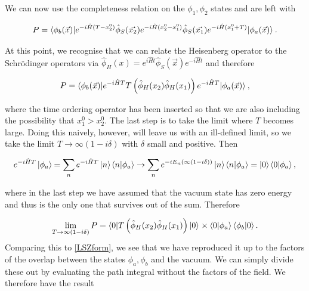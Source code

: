 We can now use the completeness relation on the $\phi_1, \phi_2$ states and are left with 

\begin{equation}
P = \mathinner{\langle\phi_b(\vec{x})\vert e^{-i \hat{H}(T - x_2^0)} \hat{\phi}_S(\vec{x_2}) e^{-i\hat{H}(x_2^0 - x_1^0)} \hat{\phi}_S(\vec{x_1}) e^{-i \hat{H}(x_1^0 + T)}\vert\phi_a(\vec{x})\rangle}_{}.
\end{equation}

At this point, we recognise that we can relate the Heisenberg operator to the Schr\"odinger operators via $\hat{\phi}_H(x) = e^{i \hat{H} t} \hat{\phi}_S(\vec{x}) e^{-i \hat{H} t}$ and therefore 

\begin{equation}
P = \mathinner{\langle\phi_b(\vec{x})\vert e^{- i \hat{H} T} T \left(\hat{\phi}_H(x_2) \hat{\phi}_H(x_1) \right) e^{-i \hat{H} T}\vert\phi_a(\vec{x})\rangle}_{},
\end{equation}

where the time ordering operator has been inserted so that we are also including the possibility that $x_1^0 > x_2^0$. The last step is to take the limit where $T$ becomes large. Doing this naively, however, will leave us with an ill-defined limit, so we take the limit $T \to \infty(1- i \delta)$ with $\delta$ small and positive. Then

\begin{equation}
e^{-i \hat{H} T} \mathinner{\lvert\phi_a\rangle}_{\hspace{-0.1em}} = \sum_n e^{-i \hat{H} T} \mathinner{\lvert n\rangle}_{\hspace{-0.1em}} \left<n | \phi_a \right> \to \sum_n e^{-i E_n (\infty(1 - i \delta))}\mathinner{\lvert n\rangle}_{\hspace{-0.1em}} \left<n | \phi_a \right> = \mathinner{\lvert0\rangle}_{\hspace{-0.1em}} \left<0 | \phi_a \right>,
\end{equation}

where in the last step we have assumed that the vacuum state has zero energy and thus is the only one that survives out of the sum. Therefore

\begin{equation}
\lim_{T \to \infty(1- i \delta)} P = \mathinner{\langle0\vert T \left(\hat{\phi}_H(x_2) \hat{\phi}_H(x_1) \right)\vert0\rangle}_{} \times \left<0 | \phi_a \right>\left<\phi_b | 0 \right>. 
\end{equation}
Comparing this to \ref{LSZform}, we see that we have reproduced it up to the factors of the overlap between the states $\phi_a, \phi_b$ and the vacuum. We can simply divide these out by evaluating the path integral without the factors of the field. We therefore have the result

